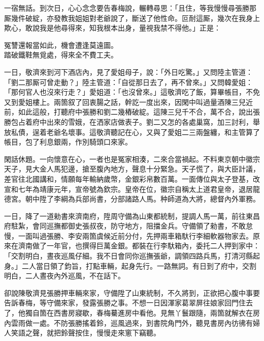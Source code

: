 一宿無話。到次日，心心念念要告春梅說，輾轉尋思：「且住，等我慢慢尋張勝那厮幾件破綻，亦發教我姐姐對老爺說了，斷送了他性命。{}叵耐這厮，幾次在我身上欺心，敢說我是他尋得來，知我根本出身，量視我禁不得他。」正是：

\begin{myquote}
冤讐還報當如此，機會遭逢莫遠圖。\\踏破鐵鞋無覓處，得來全不費工夫。
\end{myquote}

一日，敬濟來到河下酒店內，見了愛姐母子，說：「外日吃驚。」又問陸主管道：「劉二那厮可曾走動？」陸主管道：「自從那日去了，再不曾來。」又問韓愛姐：「那何官人也沒來行走？」愛姐道：「也沒曾來。」這敬濟吃了飯，算畢帳目，不免又到愛姐樓上。兩箇叙了回衷腸之話，幹訖一度出來，因閑中叫過量酒陳三兒近前，如此這般，打聽府中張勝和劉二幾樁破綻。這陳三兒千不合，萬不合，說出張勝包占着府中出來的雪娥，在洒家店做表子。劉二又怎的各處巢窩，加三討利，舉放私債，逞着老爺名壞事。{}這敬濟聽記在心，又與了愛姐二三兩盤纏，和主管算了帳目，包了利息銀兩，作別騎頭口來家。

閑話休題。一向懷意在心，一者也是冤家相湊，二來合當禍起。不料東京朝中徽宗天子，見大金人馬犯邊，搶至腹內地方，聲息十分緊急。天子慌了，與大臣計議，差官往北國講和，情願每年輸納歲幣，金銀彩帛數百萬。一面傳位與太子登基，改宣和七年為靖康元年，宣帝號為欽宗。皇帝在位，徽宗自稱太上道君皇帝，退居龍德宮。朝中陞了李綱為兵部尚書，分部諸路人馬。种師道為大將，總督內外軍務。

一日，降了一道勑書來濟南府，陞周守備為山東都統制，提調人馬一萬，前往東昌府駐紮，會同巡撫都御史張叔夜，防守地方，阻擋金兵。守備領了勑書，不敢怠慢，一面叫過張勝、李安兩箇虞候近前分付，先押兩車箱馱行李細軟器物家去。原來在濟南做了一年官，也撰得巨萬金銀。都裝在行李馱箱內，委托二人押到家中：「交割明白，晝夜巡風仔細。我不日會同你巡撫張爺，調領四路兵馬，打清河縣起身。」二人當日領了鈞旨，打點車輛，起身先行。一路無詞。有日到了府中，交割明白，二人晝夜內外巡風，不在話下。

卻說陳敬濟見張勝押車輛來家，守備陞了山東統制，不久將到，正欲把心腹中事要告訴春梅，等守備來家，發露張勝之事。不想一日因渾家葛翠屏往娘家回門住去了，他獨自箇在西書房寢歇，春梅驀進房中看他。見無丫鬟跟隨，兩箇就解衣在房內雲雨做一處。不防張勝搖着鈴，巡風過來，{}到書院角門外，聽見書房內彷彿有婦人笑語之聲，就把鈴聲按住，慢慢走來窻下竊聽。

